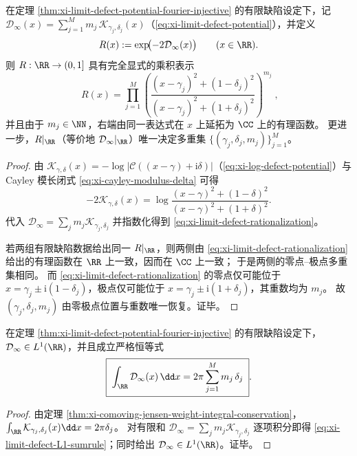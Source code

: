 \begin{proposition}\label{prop:xi-limit-defect-potential-rationalization}
在定理 \ref{thm:xi-limit-defect-potential-fourier-injective} 的有限缺陷设定下，记
\(\mathcal{D}_\infty(x)=\sum_{j=1}^{M} m_j\,\mathcal{K}_{\gamma_j,\delta_j}(x)\)（\eqref{eq:xi-limit-defect-potential}），并定义
\[
R(x):=\exp\!\bigl(-2\mathcal{D}_\infty(x)\bigr)\qquad(x\in\RR).
\]
则 \(R:\RR\to(0,1]\) 具有完全显式的乘积表示
\begin{equation}\label{eq:xi-limit-defect-rationalization}
\boxed{\;
R(x)
=\prod_{j=1}^{M}
\left(\frac{(x-\gamma_j)^2+(1-\delta_j)^2}{(x-\gamma_j)^2+(1+\delta_j)^2}\right)^{m_j}\; } ,
\end{equation}
并且由于 \(m_j\in\NN\)，右端由同一表达式在 \(x\) 上延拓为 \(\CC\) 上的有理函数。
更进一步，\(R|_{\RR}\)（等价地 \(\mathcal{D}_\infty|_{\RR}\)）唯一决定多重集 \(\{(\gamma_j,\delta_j,m_j)\}_{j=1}^{M}\)。
\end{proposition}
\begin{proof}
由 \(\mathcal{K}_{\gamma,\delta}(x)=-\log|\mathcal{C}((x-\gamma)+\mathrm{i}\delta)|\)（\eqref{eq:xi-log-defect-potential}）与 Cayley 模长闭式 \eqref{eq:xi-cayley-modulus-delta} 可得
\[
-2\mathcal{K}_{\gamma,\delta}(x)
=\log\frac{(x-\gamma)^2+(1-\delta)^2}{(x-\gamma)^2+(1+\delta)^2}.
\]
代入 \(\mathcal{D}_\infty=\sum_j m_j\mathcal{K}_{\gamma_j,\delta_j}\) 并指数化得到 \eqref{eq:xi-limit-defect-rationalization}。
\par
若两组有限缺陷数据给出同一 \(R|_{\RR}\)，则两侧由 \eqref{eq:xi-limit-defect-rationalization} 给出的有理函数在 \(\RR\) 上一致，因而在 \(\CC\) 上一致；
于是两侧的零点--极点多重集相同。
而 \eqref{eq:xi-limit-defect-rationalization} 的零点仅可能位于
\(
x=\gamma_j\pm \mathrm{i}(1-\delta_j)
\)，极点仅可能位于
\(
x=\gamma_j\pm \mathrm{i}(1+\delta_j)
\)，其重数均为 \(m_j\)。
故 \((\gamma_j,\delta_j,m_j)\) 由零极点位置与重数唯一恢复。证毕。
\end{proof}

\begin{corollary}\label{cor:xi-limit-defect-potential-L1-sumrule}
在定理 \ref{thm:xi-limit-defect-potential-fourier-injective} 的有限缺陷设定下，\(\mathcal{D}_\infty\in L^1(\RR)\)，并且成立严格恒等式
\begin{equation}\label{eq:xi-limit-defect-L1-sumrule}
\boxed{\;
\int_{\RR}\mathcal{D}_\infty(x)\,\dd x
=2\pi\sum_{j=1}^{M} m_j\,\delta_j\; } .
\end{equation}
\end{corollary}
\begin{proof}
由定理 \ref{thm:xi-comoving-jensen-weight-integral-conservation}，
\(
\int_{\RR}\mathcal{K}_{\gamma_j,\delta_j}(x)\dd x=2\pi\delta_j
\)。
对有限和 \(\mathcal{D}_\infty=\sum_j m_j\mathcal{K}_{\gamma_j,\delta_j}\) 逐项积分即得 \eqref{eq:xi-limit-defect-L1-sumrule}；同时给出 \(\mathcal{D}_\infty\in L^1(\RR)\)。证毕。
\end{proof}

